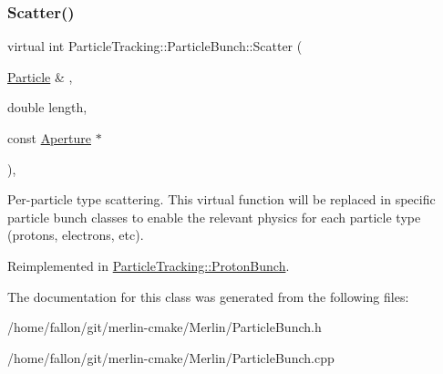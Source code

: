 \subsubsection{\texorpdfstring{Scatter()}{Scatter()}}
{\footnotesize\ttfamily virtual int Particle\+Tracking\+::\+Particle\+Bunch\+::\+Scatter (\begin{DoxyParamCaption}\item[{\hyperlink{classPSvector}{Particle} \&}]{,  }\item[{double}]{length,  }\item[{const \hyperlink{classAperture}{Aperture} $\ast$}]{ }\end{DoxyParamCaption})\hspace{0.3cm}{\ttfamily [inline]}, {\ttfamily [virtual]}}

Per-\/particle type scattering. This virtual function will be replaced in specific particle bunch classes to enable the relevant physics for each particle type (protons, electrons, etc). 

Reimplemented in \hyperlink{classParticleTracking_1_1ProtonBunch_adca6b2edceb4186ed0c0b6cf0437cbae}{Particle\+Tracking\+::\+Proton\+Bunch}.



The documentation for this class was generated from the following files\+:\begin{DoxyCompactItemize}
\item 
/home/fallon/git/merlin-\/cmake/\+Merlin/Particle\+Bunch.\+h\item 
/home/fallon/git/merlin-\/cmake/\+Merlin/Particle\+Bunch.\+cpp\end{DoxyCompactItemize}
